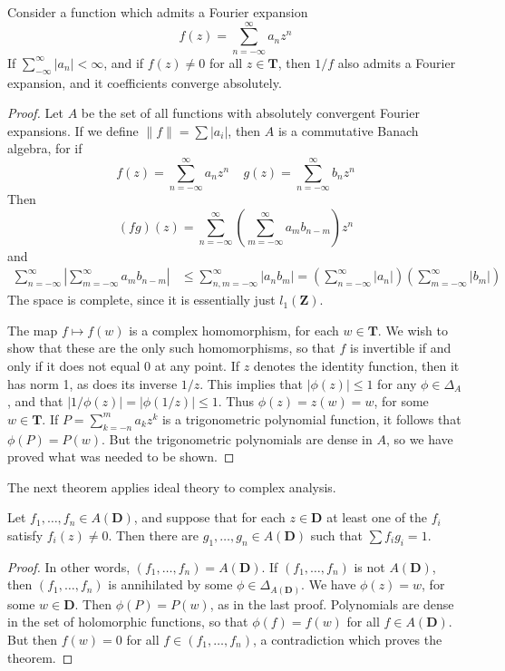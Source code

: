 \begin{lemma}
    Consider a function which admits a Fourier expansion
    \[ f(z) = \sum_{n = -\infty}^\infty a_n z^n \]
    If $\sum_{-\infty}^\infty |a_n| < \infty$, and if $f(z) \neq 0$ for all $z \in \mathbf{T}$, then $1/f$ also admits a Fourier expansion, and it coefficients converge absolutely.
\end{lemma}
\begin{proof}
    Let $A$ be the set of all functions with absolutely convergent Fourier expansions. If we define $\| f \| = \sum |a_i|$, then $A$ is a commutative Banach algebra, for if
    \[ f(z) = \sum_{n = -\infty}^\infty a_n z^n\ \ \ \ \ g(z) = \sum_{n = -\infty}^\infty b_n z^n \]
    Then
    \[ (fg)(z) = \sum_{n = -\infty}^\infty \left ( \sum_{m = -\infty}^\infty a_m b_{n-m} \right) z^n \]
    and
    \begin{align*}
        \sum_{n = -\infty}^\infty \left| \sum_{m = -\infty}^\infty a_m b_{n-m} \right| &\leq \sum_{n,m = -\infty}^\infty |a_n b_m| = \left( \sum_{n = -\infty}^\infty |a_n| \right) \left( \sum_{m = -\infty}^\infty |b_m| \right)
    \end{align*}
    The space is complete, since it is essentially just $l_1(\mathbf{Z})$.

    The map $f \mapsto f(w)$ is a complex homomorphism, for each $w \in \mathbf{T}$. We wish to show that these are the only such homomorphisms, so that $f$ is invertible if and only if it does not equal 0 at any point. If $z$ denotes the identity function, then it has norm 1, as does its inverse $1/z$. This implies that $|\phi(z)| \leq 1$ for any $\phi \in \Delta_A$, and that $|1/\phi(z)| = |\phi(1/z)| \leq 1$. Thus $\phi(z) = z(w) = w$, for some $w \in \mathbf{T}$. If $P = \sum_{k = -n}^m a_k z^k$ is a trigonometric polynomial function, it follows that $\phi(P) = P(w)$. But the trigonometric polynomials are dense in $A$, so we have proved what was needed to be shown.
\end{proof}

The next theorem applies ideal theory to complex analysis.

\begin{lemma}
    Let $f_1, \dots, f_n \in A(\mathbf{D})$, and suppose that for each $z \in \mathbf{D}$ at least one of the $f_i$ satisfy $f_i(z) \neq 0$. Then there are $g_1, \dots, g_n \in A(\mathbf{D})$ such that $\sum f_i g_i = 1$.
\end{lemma}
\begin{proof}
    In other words, $(f_1, \dots, f_n) = A(\mathbf{D})$. If $(f_1, \dots, f_n)$ is not $A(\mathbf{D})$, then $(f_1, \dots, f_n)$ is annihilated by some $\phi \in \Delta_{A(\mathbf{D})}$. We have $\phi(z) = w$, for some $w \in \mathbf{D}$. Then $\phi(P) = P(w)$, as in the last proof. Polynomials are dense in the set of holomorphic functions, so that $\phi(f) = f(w)$ for all $f \in A(\mathbf{D})$. But then $f(w) = 0$ for all $f \in (f_1, \dots, f_n)$, a contradiction which proves the theorem.
\end{proof}





